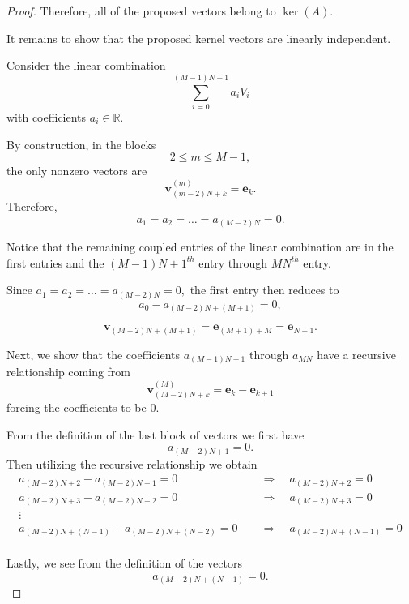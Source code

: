 \documentclass{article}
\begin{document}
\begin{proof}
Therefore, all of the proposed vectors belong to $\ker(A)$.

It remains to show that the proposed kernel vectors are linearly independent.

Consider the linear combination
\[\sum_{i=0}^{(M-1)N-1}a_iV_i\]
with coefficients $a_i\in\mathbb{R}.$

\noindent By construction, in the blocks
\[2\leq m\leq M-1,\]
the only nonzero vectors are
\[
\mathbf{v}_{(m-2)N+k}^{(m)}
=
\mathbf{e}_k.
\]
Therefore,
\[
a_1=a_2=\dots=a_{(M-2)N}=0.
\]

Notice that the remaining coupled entries of the linear combination are in the first entries and the $(M-1)N+1^{th}$ entry through $MN^{th}$ entry.

Since $a_1=a_2=\dots=a_{(M-2)N}=0,$ the first entry then reduces to
\[
a_0-a_{(M-2)N+(M+1)}=0,
\]

\[
\mathbf{v}_{(M-2)N+(M+1)}
=
\mathbf{e}_{(M+1)+M}
=
\mathbf{e}_{N+1}.
\]

Next, we show that the coefficients $a_{(M-1)N+1}$ through $a_{MN}$ have a recursive relationship coming from
\[
\mathbf{v}_{(M-2)N+k}^{(M)}
=
\mathbf{e}_k-\mathbf{e}_{k+1}
\]
forcing the coefficients to be 0.

From the definition of the last block of vectors we first have
\[ a_{(M-2)N+1}=0.\]
Then utilizing the recursive relationship we obtain
\begin{align*}
    a_{(M-2)N+2}-a_{(M-2)N+1}=0 &\quad\Rightarrow \quad a_{(M-2)N+2}=0\\
    a_{(M-2)N+3}-a_{(M-2)N+2}=0\ &\quad\Rightarrow \quad a_{(M-2)N+3}=0\\
    \vdots\\
    a_{(M-2)N+(N-1)}-a_{(M-2)N+(N-2)}=0\ &\quad\Rightarrow \quad a_{(M-2)N+(N-1)}=0\\
\end{align*}

Lastly, we see from the definition of the vectors \[a_{(M-2)N+(N-1)}=0.\]



\end{proof}
\end{document}
